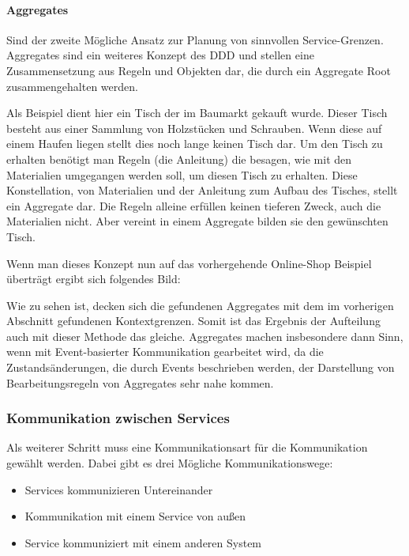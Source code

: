 \documentclass[12pt,a4paper,bibliography=totocnumbered,listof=totocnumbered]{scrartcl}
\begin{document}
\paragraph{Aggregates}

Sind der zweite Mögliche Ansatz zur Planung von sinnvollen Service-Grenzen. Aggregates sind ein weiteres Konzept des \ac{DDD} und stellen eine Zusammensetzung aus Regeln und Objekten dar, die durch ein Aggregate Root zusammengehalten werden.

Als Beispiel dient hier ein Tisch der im Baumarkt gekauft wurde. Dieser Tisch besteht aus einer Sammlung von Holzstücken und Schrauben. Wenn diese auf einem Haufen liegen stellt dies noch lange keinen Tisch dar. Um den Tisch zu erhalten benötigt man Regeln (die Anleitung) die besagen, wie mit den Materialien umgegangen werden soll, um diesen Tisch zu erhalten. Diese Konstellation, von Materialien und der Anleitung zum Aufbau des Tisches, stellt ein Aggregate dar. Die Regeln alleine erfüllen keinen tieferen Zweck, auch die Materialien nicht. Aber vereint in einem Aggregate bilden sie den gewünschten Tisch.\cite{mogosanu}

Wenn man dieses Konzept nun auf das vorhergehende Online-Shop Beispiel überträgt ergibt sich folgendes Bild:


Wie zu sehen ist, decken sich die gefundenen Aggregates mit dem im vorherigen Abschnitt gefundenen Kontextgrenzen. Somit ist das Ergebnis der Aufteilung auch mit dieser Methode das gleiche. Aggregates machen insbesondere dann Sinn, wenn mit Event-basierter Kommunikation gearbeitet wird, da die Zustandsänderungen, die durch Events beschrieben werden, der Darstellung von Bearbeitungsregeln von Aggregates sehr nahe kommen.

\subsubsection{Kommunikation zwischen Services}

Als weiterer Schritt muss eine Kommunikationsart für die Kommunikation gewählt werden. Dabei gibt es drei Mögliche Kommunikationswege:

\begin{itemize}
	\item Services kommunizieren Untereinander
	\item Kommunikation mit einem Service von außen
	\item Service kommuniziert mit einem anderen System
\end{itemize}
\end{document}
